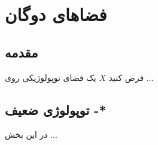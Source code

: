 \chapter{فضاهای دوگان }

\section{مقدمه}
فرض کنید $X$ یک فضای توپولوژیکی روی ...
\section{توپولوژی ضعیف -*}
در این بخش ...

